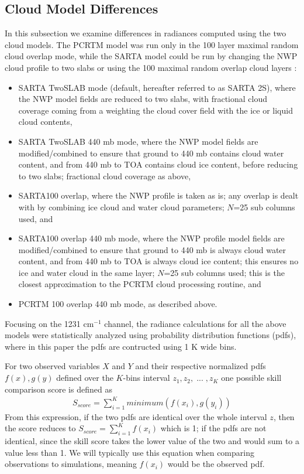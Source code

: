 \documentclass[agupp]{aguplus}              %
\newcommand{\wn}{cm$^{-1}$\xspace}
\begin{document}
\begin{article}
\subsection{Cloud Model Differences}

In this subsection we examine differences in radiances computed using
the two cloud models. The PCRTM model was run only in the 100 layer
maximal random cloud overlap mode, while the SARTA model could be run
by changing the NWP cloud profile to two slabs or using the 100
maximal random overlap cloud layers :
\begin{itemize} 
  \item SARTA TwoSLAB mode (default, hereafter referred to as SARTA 2S), where the NWP model fields are
    reduced to two slabs, with fractional cloud coverage coming from a
    weighting the cloud cover field with the ice or liquid cloud contents,
  \item SARTA TwoSLAB 440 mb mode, where the NWP model fields are
     modified/combined to ensure that ground to 440 mb contains cloud
     water content, and from 440 mb to TOA contains cloud ice content, before
     reducing to two slabs; fractional cloud coverage as above, 
  \item SARTA100 overlap, where the NWP profile is taken as is; any overlap is
     dealt with by combining ice cloud and water cloud parameters; $N$=25
     sub columns used, and 
  \item SARTA100 overlap 440 mb mode, where the NWP profile model fields are 
     modified/combined to ensure that ground to
     440 mb is always cloud water content, and from 440 mb to TOA is always
     cloud ice content; this ensures no ice and water cloud in the same layer;
     $N$=25 sub columns used; this is the closest approximation to the PCRTM
     cloud processing routine, and
  \item PCRTM 100 overlap 440 mb mode, as described above.
\end{itemize} 
Focusing on the 1231 \wn channel, the radiance calculations for all
the above models were statistically analyzed using probability
distribution functions (pdfs), where in this paper the pdfs are contructed using
1 K wide bins.  

For two observed variables $X$ and $Y$ and their respective normalized
pdfs $f(x), g(y)$ defined over the $K$-bins interval $z_1,z_2, \;
... \; ,z_K$ one possible skill comparison score \citep{per:07} is
defined as 
\begin{eqnarray} 
S_{score} = \sum_{i=1}^K minimum(f(x_i),g(y_i))
\end{eqnarray} 
From this expression, if the two pdfs are identical over the whole
interval $z$, then the score reduces to $S_{score} = \sum_{i=1}^K f(x_i)$ 
which is 1; if the pdfs are not identical, since the skill
score takes the lower value of the two and would sum to a value less
than 1. We will typically use this equation when comparing
observations to simulations, meaning $f(x_i)$ would be the observed
pdf.


\end{article}
\end{document}
